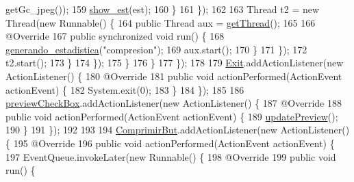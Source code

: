 \begin{DoxyCode}
      getGc\_jpeg());
159                                     \hyperlink{classpresentacion_1_1form_1_1mainForm_a6eb9e9b4f7bb6da2c592a5a0294a6a06}{show\_est}(est);
160                                 \}
161                             \});
162 
163                             Thread t2 = \textcolor{keyword}{new} Thread(\textcolor{keyword}{new} Runnable() \{
164                                 \textcolor{keyword}{public} Thread aux = \hyperlink{classpresentacion_1_1form_1_1mainForm_ac6348f8bdef39bfa651f145c00664320}{getThread}();
165 
166                                 @Override
167                                 \textcolor{keyword}{public} \textcolor{keyword}{synchronized} \textcolor{keywordtype}{void} run() \{
168                                     \hyperlink{classpresentacion_1_1form_1_1mainForm_a34580a4b6e2c162d35ab5502f0ac7e4c}{generando\_estadistica}(\textcolor{stringliteral}{"compresion"});
169                                     aux.start();
170                                 \}
171                             \});
172                             t2.start();
173                         \}
174                     \});
175                 \}
176             \}
177         \});
178 
179         \hyperlink{classpresentacion_1_1form_1_1mainForm_a721fa95a4d72e8f68875fcc0003e041f}{Exit}.addActionListener(\textcolor{keyword}{new} ActionListener() \{
180             @Override
181             \textcolor{keyword}{public} \textcolor{keywordtype}{void} actionPerformed(ActionEvent actionEvent) \{
182                 System.exit(0);
183             \}
184         \});
185 
186         \hyperlink{classpresentacion_1_1form_1_1mainForm_a0dbe9873e69c0702a519d1cd171594c0}{previewCheckBox}.addActionListener(\textcolor{keyword}{new} ActionListener() \{
187             @Override
188             \textcolor{keyword}{public} \textcolor{keywordtype}{void} actionPerformed(ActionEvent actionEvent) \{
189                 \hyperlink{classpresentacion_1_1form_1_1mainForm_aa71c48a8ef6eb2b3913dd665e5439538}{updatePreview}();
190             \}
191         \});
192 
193 
194         \hyperlink{classpresentacion_1_1form_1_1mainForm_a8a68ad38dda26d35d37dccec4fa9338d}{ComprimirBut}.addActionListener(\textcolor{keyword}{new} ActionListener() \{
195             @Override
196             \textcolor{keyword}{public} \textcolor{keywordtype}{void} actionPerformed(ActionEvent actionEvent) \{
197                 EventQueue.invokeLater(\textcolor{keyword}{new} Runnable() \{
198                     @Override
199                     \textcolor{keyword}{public} \textcolor{keywordtype}{void} run() \{

\end{DoxyCode}
